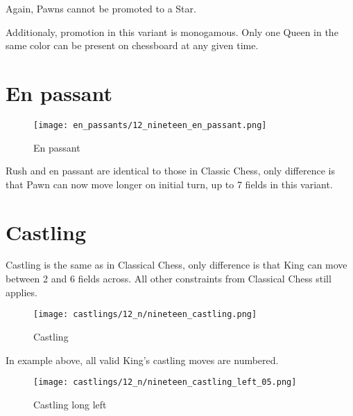 Again, Pawns cannot be promoted to a Star.

Additionaly, promotion in this variant is monogamous.
Only one Queen in the same color can be present on chessboard at any given time.

\clearpage %

\section*{En passant}

\noindent
\begin{wrapfigure}{l}{0.4\textwidth}
\centering
\texttt{[image: en\_passants/12\_nineteen\_en\_passant.png]}
\caption{En passant}
\label{fig:12_nineteen_en_passant}
\end{wrapfigure}
Rush and en passant are identical to those in Classic Chess, only difference
is that Pawn can now move longer on initial turn, up to 7 fields in this
variant.

\clearpage %

\section*{Castling}

Castling is the same as in Classical Chess, only difference is that King can move between 2 and 6 fields across.
All other constraints from Classical Chess still applies.

\noindent
\begin{figure}[!h]
\texttt{[image: castlings/12\_n/nineteen\_castling.png]}
\caption{Castling}
\label{fig:nineteen_castling}
\end{figure}

In example above, all valid King's castling moves are numbered.

\noindent
\begin{figure}[!h]
\texttt{[image: castlings/12\_n/nineteen\_castling\_left\_05.png]}
\caption{Castling long left}
\label{fig:nineteen_castling_left_05}
\end{figure}

